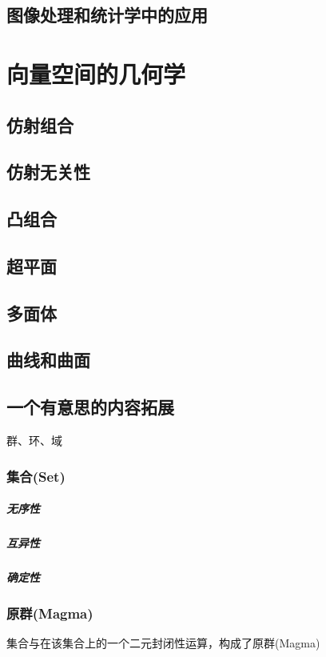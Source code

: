 \documentclass{article}
\begin{document}
\begin{CJK}{UTF8}{gkai}
\subsection{图像处理和统计学中的应用}
\newpage
\section{向量空间的几何学}
\subsection{仿射组合}

\subsection{仿射无关性}


\subsection{凸组合}

\subsection{超平面}

\subsection{多面体}

\subsection{曲线和曲面}
\newpage
\subsection*{一个有意思的内容拓展}
群、环、域
\subsubsection*{集合(Set)}
\subparagraph{无序性}

\subparagraph{互异性}

\subparagraph{确定性}

\subsubsection*{原群(Magma)}
集合与在该集合上的一个二元封闭性运算，构成了原群(Magma)\\


\end{CJK}
\end{document}
